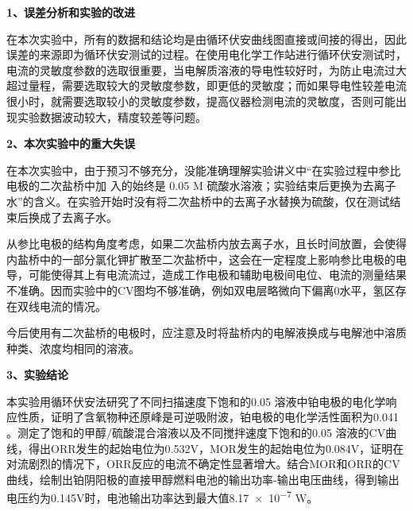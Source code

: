 \noindent \textbf{1、误差分析和实验的改进} \par
在本次实验中，所有的数据和结论均是由循环伏安曲线图直接或间接的得出，因此误差的来源即为循环伏安测试的过程。在使用电化学工作站进行循环伏安测试时，电流的灵敏度参数的选取很重要，当电解质溶液的导电性较好时，为防止电流过大超过量程，需要选取较大的灵敏度参数，即更低的灵敏度；而如果导电性较差电流很小时，就需要选取较小的灵敏度参数，提高仪器检测电流的灵敏度，否则可能出现实验数据波动较大，精度较差等问题。\par 
\noindent \textbf{2、本次实验中的重大失误} \par
在本次实验中，由于预习不够充分，没能准确理解实验讲义中“在实验过程中参比电极的二次盐桥中加 入的始终是 0.05 M 硫酸水溶液；实验结束后更换为去离子水”的含义。在实验开始时没有将二次盐桥中的去离子水替换为硫酸，仅在测试结束后换成了去离子水。\par 
从参比电极的结构角度考虑，如果二次盐桥内放去离子水，且长时间放置，会使得内盐桥中的一部分氯化钾扩散至二次盐桥中，这会在一定程度上影响参比电极的电导，可能使得其上有电流流过，造成工作电极和辅助电极间电位、电流的测量结果不准确。因而实验中的CV图均不够准确，例如双电层略微向下偏离0水平，氢区存在双线电流的情况。\par 
今后使用有二次盐桥的电极时，应注意及时将盐桥内的电解液换成与电解池中溶质种类、浓度均相同的溶液。\par
\noindent \textbf{3、实验结论} \par
本实验用循环伏安法研究了不同扫描速度下饱和的0.05   溶液中铂电极的电化学响应性质，证明了含氧物种还原峰是可逆吸附波，铂电极的电化学活性面积为0.041 。测定了饱和的甲醇/硫酸混合溶液以及不同搅拌速度下饱和的0.05   溶液的CV曲线，得出ORR发生的起始电位为0.532V，MOR发生的起始电位为0.084V，证明在对流剧烈的情况下，ORR反应的电流不确定性显著增大。结合MOR和ORR的CV曲线，绘制出铂阴阳极的直接甲醇燃料电池的输出功率-输出电压曲线，得到输出电压约为0.145V时，电池输出功率达到最大值\num{8.17e-7} W。\par 
